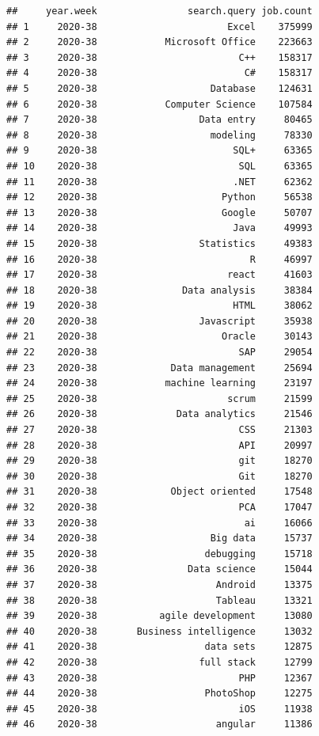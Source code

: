 \documentclass[
]{article}
\begin{document}
\begin{verbatim}
##     year.week                search.query job.count
## 1     2020-38                       Excel    375999
## 2     2020-38            Microsoft Office    223663
## 3     2020-38                         C++    158317
## 4     2020-38                          C#    158317
## 5     2020-38                    Database    124631
## 6     2020-38            Computer Science    107584
## 7     2020-38                  Data entry     80465
## 8     2020-38                    modeling     78330
## 9     2020-38                        SQL+     63365
## 10    2020-38                         SQL     63365
## 11    2020-38                        .NET     62362
## 12    2020-38                      Python     56538
## 13    2020-38                      Google     50707
## 14    2020-38                        Java     49993
## 15    2020-38                  Statistics     49383
## 16    2020-38                           R     46997
## 17    2020-38                       react     41603
## 18    2020-38               Data analysis     38384
## 19    2020-38                        HTML     38062
## 20    2020-38                  Javascript     35938
## 21    2020-38                      Oracle     30143
## 22    2020-38                         SAP     29054
## 23    2020-38             Data management     25694
## 24    2020-38            machine learning     23197
## 25    2020-38                       scrum     21599
## 26    2020-38              Data analytics     21546
## 27    2020-38                         CSS     21303
## 28    2020-38                         API     20997
## 29    2020-38                         git     18270
## 30    2020-38                         Git     18270
## 31    2020-38             Object oriented     17548
## 32    2020-38                         PCA     17047
## 33    2020-38                          ai     16066
## 34    2020-38                    Big data     15737
## 35    2020-38                   debugging     15718
## 36    2020-38                Data science     15044
## 37    2020-38                     Android     13375
## 38    2020-38                     Tableau     13321
## 39    2020-38           agile development     13080
## 40    2020-38       Business intelligence     13032
## 41    2020-38                   data sets     12875
## 42    2020-38                  full stack     12799
## 43    2020-38                         PHP     12367
## 44    2020-38                   PhotoShop     12275
## 45    2020-38                         iOS     11938
## 46    2020-38                     angular     11386

\end{verbatim}
\end{document}
